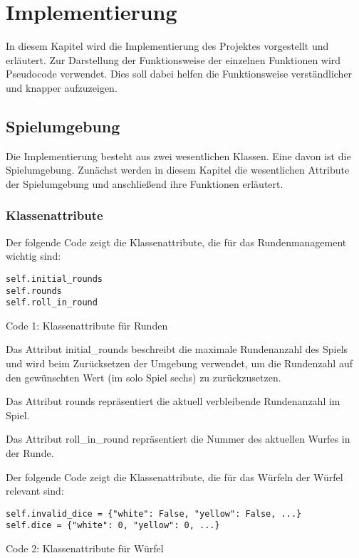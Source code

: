 \section{Implementierung}
In diesem Kapitel wird die Implementierung des Projektes vorgestellt und erläutert. Zur Darstellung der Funktionsweise der einzelnen Funktionen wird Pseudocode verwendet. Dies soll dabei helfen die Funktionsweise verständlicher und knapper aufzuzeigen.
\subsection{Spielumgebung}
Die Implementierung besteht aus zwei wesentlichen Klassen. Eine davon ist die Spielumgebung. Zunächst werden in diesem Kapitel die wesentlichen Attribute der Spielumgebung und anschließend ihre Funktionen erläutert.
\subsubsection{Klassenattribute}
\begin{minipage}{\linewidth}
Der folgende Code zeigt die Klassenattribute, die für das Rundenmanagement wichtig sind:
\vspace{0.5cm}
\begin{lstlisting}
self.initial_rounds
self.rounds
self.roll_in_round
\end{lstlisting}
Code 1: Klassenattribute für Runden\\
\end{minipage}

Das Attribut initial\_rounds beschreibt die maximale Rundenanzahl des Spiels und wird beim Zurücksetzen der Umgebung verwendet, um die Rundenzahl auf den gewünschten Wert (im solo Spiel sechs) zu zurückzusetzen.

Das Attribut rounds repräsentiert die aktuell verbleibende Rundenanzahl im Spiel.

Das Attribut roll\_in\_round repräsentiert die Nummer des aktuellen Wurfes in der Runde.\\

\begin{minipage}{\linewidth}
Der folgende Code zeigt die Klassenattribute, die für das Würfeln der Würfel relevant sind:
\vspace{0.5cm}
\begin{lstlisting}
self.invalid_dice = {"white": False, "yellow": False, ...}
self.dice = {"white": 0, "yellow": 0, ...}
\end{lstlisting}
Code 2: Klassenattribute für Würfel\\
\end{minipage}

